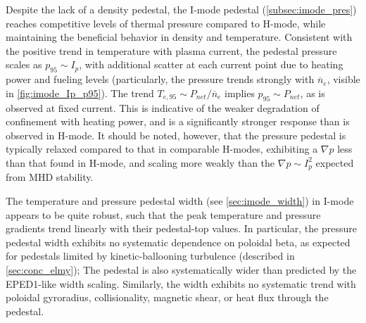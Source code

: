 Despite the lack of a density pedestal, the I-mode pedestal (\cref{subsec:imode_pres}) reaches competitive levels of thermal pressure compared to H-mode, while maintaining the beneficial behavior in density and temperature.  Consistent with the positive trend in temperature with plasma current, the pedestal pressure scales as $p_{95} \sim I_p$, with additional scatter at each current point due to heating power and fueling levels (particularly, the pressure trends strongly with $\overline{n}_e$, visible in \cref{fig:imode_Ip_p95}).  The trend $T_{e,95} \sim P_{net}/\overline{n}_e$ implies $p_{95} \sim P_{net}$, as is observed at fixed current.  This is indicative of the weaker degradation of confinement with heating power, and is a significantly stronger response than is observed in H-mode.  It should be noted, however, that the pressure pedestal is typically relaxed compared to that in comparable H-modes, exhibiting a $\nabla p$ less than that found in H-mode, and scaling more weakly than the $\nabla p \sim I_p^2$ expected from MHD stability.

The temperature and pressure pedestal width (see \cref{sec:imode_width}) in I-mode appears to be quite robust, such that the peak temperature and pressure gradients trend linearly with their pedestal-top values.  In particular, the pressure pedestal width exhibits no systematic dependence on poloidal beta, as expected for pedestals limited by kinetic-ballooning turbulence (described in \cref{sec:conc_elmy}); The pedestal is also systematically wider than predicted by the EPED1-like width scaling.  Similarly, the width exhibits no systematic trend with poloidal gyroradius, collisionality, magnetic shear, or heat flux through the pedestal.

